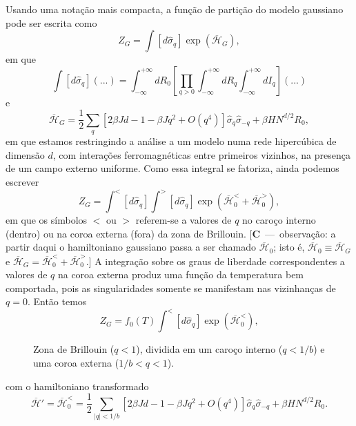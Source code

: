 \documentclass[12pt,a4paper]{article}
\newcommand{\Hb}{\overline{\mathcal{H}}}
\newcommand{\sh}{\widehat{\sigma}}
\newcounter{corr}
\newcommand{\nota}[2]{\refstepcounter{corr}\label{#1}%
  {\color{red}\small[\textbf{C\thecorr}~---~#2]}}
\begin{document}
Usando uma notação mais compacta, a função de partição do modelo
gaussiano pode ser escrita como
\begin{equation}
Z_G=\int\left[d\sh_q\right]\exp\left(\Hb_G\right),
\end{equation}
em que
\begin{equation}
\int\left[d\sh_q\right](...)=\int_{-\infty}^{+\infty}dR_0\left[\prod_{q>0}\int_{-\infty}^{+\infty}dR_q\int_{-\infty}^{+\infty}dI_q\right](...)
\end{equation}
e
\begin{equation}
\Hb_G=\frac12\sum_q\left[2\beta Jd-1-\beta Jq^2+O\left(q^4\right)\right]\sh_q\sh_{-q}+\beta HN^{d/2}R_0,
\end{equation}
em que estamos restringindo a análise a um modelo numa rede hipercúbica
de dimensão $d$, com interações ferromagnéticas entre primeiros vizinhos, na
presença de um campo externo uniforme. Como essa integral se fatoriza,
ainda podemos escrever
\begin{equation}
Z_G=\int^{<}\left[d\sh_q\right]\int^{>}\left[d\sh_q\right]\exp\left(\Hb_0^{<}+\Hb_0^{>}\right),
\end{equation}
em que os símbolos $<$ ou $>$ referem-se a valores de $q$ no caroço interno
(dentro) ou na coroa externa (fora) da zona de Brillouin.
\nota{c:h0}{observação: a partir daqui o hamiltoniano gaussiano passa a ser chamado
$\Hb_0$; isto é, $\Hb_0\equiv\Hb_G$ e $\Hb_G=\Hb_0^<+\Hb_0^>$.}
A integração sobre
os graus de liberdade correspondentes a valores de $q$ na coroa externa produz
uma função da temperatura bem comportada, pois as singularidades somente
se manifestam nas vizinhanças de $q=0$. Então temos
\begin{equation}
Z_G=f_0\left(T\right)\int^{<}\left[d\sh_q\right]\exp\left(\Hb_0^{<}\right),
\end{equation}

\begin{figure}[H]
\centering
{}
\caption{Zona de Brillouin ($q<1$), dividida em um caroço interno ($q<1/b$)
e uma coroa externa ($1/b<q<1$).}
\end{figure}

\noindent com o hamiltoniano transformado
\begin{equation}
\Hb'=\Hb_0^{<}=\frac12\sum_{|q|<1/b}\left[2\beta Jd-1-\beta Jq^2+O\left(q^4\right)\right]\sh_q\sh_{-q}+\beta HN^{d/2}R_0.
\end{equation}
\end{document}
